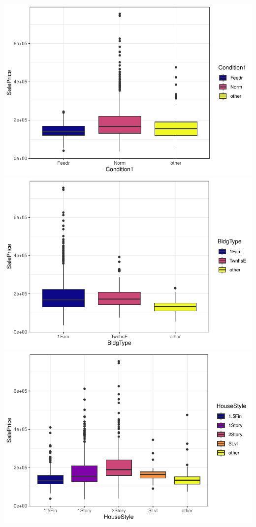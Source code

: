 \documentclass[
]{article}
\begin{document}
\includegraphics{report_files/figure-latex/categorical variables-7.pdf}
\includegraphics{report_files/figure-latex/categorical variables-8.pdf}
\includegraphics{report_files/figure-latex/categorical variables-9.pdf}
\end{document}
